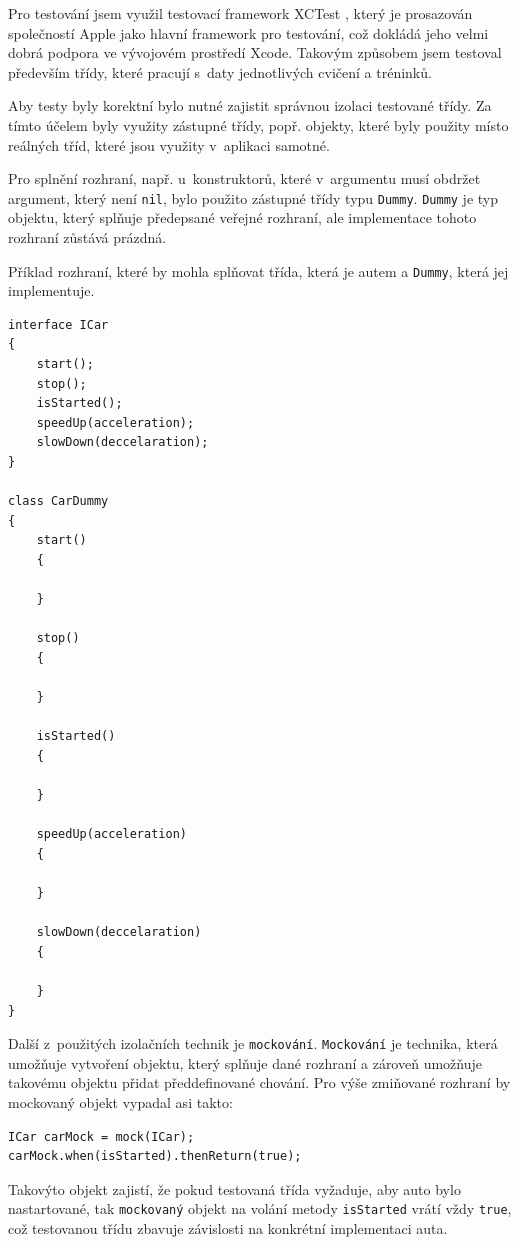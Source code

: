 \documentclass[thesis=B,czech]{FITthesis}[2012/06/26]
\begin{document}
	Pro testování jsem využil testovací framework XCTest \cite{xctestOnline}, který je prosazován společností Apple jako hlavní framework pro testování, což dokládá jeho velmi dobrá podpora ve vývojovém prostředí Xcode. Takovým způsobem jsem testoval především třídy, které pracují s~daty jednotlivých cvičení a tréninků.

	Aby testy byly korektní bylo nutné zajistit správnou izolaci testované třídy. Za tímto účelem byly využity zástupné třídy, popř. objekty, které byly použity místo reálných tříd, které jsou využity v~aplikaci samotné.

	Pro splnění rozhraní, např. u~konstruktorů, které v~argumentu musí obdržet argument, který není \verb|nil|, bylo použito zástupné třídy typu \texttt{Dummy}. \texttt{Dummy} je typ objektu, který splňuje předepsané veřejné rozhraní, ale implementace tohoto rozhraní zůstává prázdná.

	Příklad rozhraní, které by mohla splňovat třída, která je autem a \texttt{Dummy}, která jej implementuje.
	\begin{lstlisting}
interface ICar
{
	start();
	stop();
	isStarted();
	speedUp(acceleration);
	slowDown(deccelaration);
}

class CarDummy
{
	start()
	{

	}

	stop()
	{

	}

	isStarted()
	{

	}

	speedUp(acceleration)
	{

	}

	slowDown(deccelaration)
	{

	}
}
	\end{lstlisting}

	Další z~použitých izolačních technik je \texttt{mockování}. \texttt{Mockování} je technika, která umožňuje vytvoření objektu, který splňuje dané rozhraní a zároveň umožňuje takovému objektu přidat předdefinované chování. Pro výše zmiňované rozhraní by mockovaný objekt vypadal asi takto:
	\begin{lstlisting}
ICar carMock = mock(ICar);
carMock.when(isStarted).thenReturn(true);
	\end{lstlisting}
	Takovýto objekt zajistí, že pokud testovaná třída vyžaduje, aby auto bylo nastartované, tak \texttt{mockovaný} objekt na volání metody \verb|isStarted| vrátí vždy \verb|true|, což testovanou třídu zbavuje závislosti na konkrétní implementaci auta.
\end{document}
